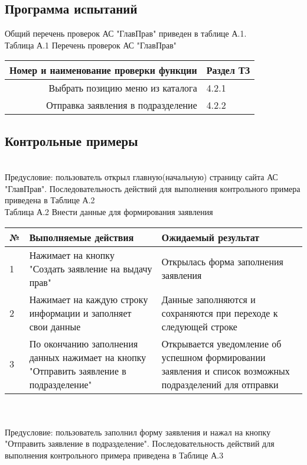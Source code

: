 \documentclass[russian, utf8, 12pt,pointsubsection,floatsubsection]{eskdtext}
\begin{document}
\subsection{Программа испытаний}
Общий перечень проверок АС "ГлавПрав" приведен в таблице А.1.\\

Таблица А.1  Перечень проверок АС "ГлавПрав"\\
\begin{tabular}{|r|l|}
\hline 
Номер и наименование проверки функции & Раздел ТЗ\\
\hline \hline
Выбрать позицию меню из каталога & 4.2.1 \\
\hline
Отправка заявления в
подразделение & 4.2.2 \\
\hline
\end{tabular}

\subsection{Контрольные примеры}
\\ 

Предусловие: пользователь открыл главную(начальную) страницу сайта АС "ГлавПрав". Последовательность действий для выполнения контрольного примера приведена в Таблице А.2\\

Таблица А.2 Внести данные для формирования заявления\\
\begin{tabular}{| l |  p{8cm} | p{8cm} |}
\hline 
№  &  Выполняемые действия & Ожидаемый результат\\
\hline \hline
1  & Нажимает на кнопку "Создать заявление на выдачу прав" & Открылась форма заполнения заявления \\
\hline
2  & Нажимает на каждую строку информации и заполняет свои данные & Данные заполняются и сохраняются при переходе к следующей строке\\
\hline
3  & По окончанию заполнения данных нажимает на кнопку "Отправить заявление в подразделение" & Открывается уведомление об успешном формировании заявления и список возможных подразделений для отправки\\
\hline
\end{tabular}
\\


\\
Предусловие: пользователь заполнил форму заявления и нажал на кнопку "Отправить заявление в подразделение". Последовательность действий для выполнения контрольного примера приведена в Таблице А.3\\
\end{document}
